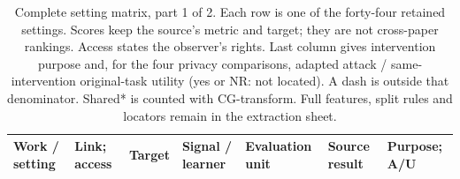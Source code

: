 \begin{table}[t]\centering\footnotesize
\caption{Complete setting matrix, part 1 of 2. Each row is one of the forty-four retained settings. Scores keep the source's metric and target; they are not cross-paper rankings. Access states the observer's rights. Last column gives intervention purpose and, for the four privacy comparisons, adapted attack / same-intervention original-task utility (yes or NR: not located). A dash is outside that denominator. Shared* is counted with CG-transform. Full features, split rules and locators remain in the extraction sheet.}\label{tab:complete-matrix-a}
\setlength{\tabcolsep}{3pt}\renewcommand{\arraystretch}{1.12}
\begin{tabularx}{\textwidth}{@{}P{.14\textwidth}P{.11\textwidth}P{.13\textwidth}P{.14\textwidth}P{.12\textwidth}Y P{.09\textwidth}@{}}\toprule
Work / setting & Link; access & Target & Signal / learner & Evaluation unit & Source result & Purpose; A/U \\\midrule


\end{tabularx}
\end{table}

